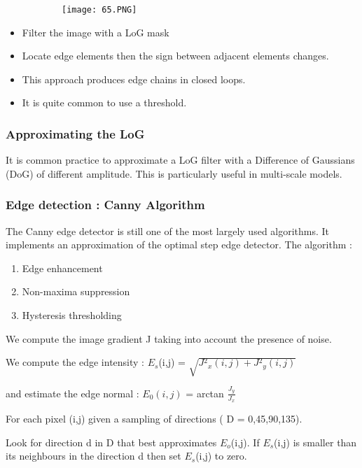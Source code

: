 \documentclass{article}
\begin{document}
\begin{figure}[ht!]
  \centering
  \begin{subfigure}[b]{0.45\linewidth}
    \texttt{[image: 65.PNG]}
  \end{subfigure}
\end{figure}

\begin{itemize}
    \item Filter the image with a LoG mask
    \item Locate edge elements then the sign between adjacent elements changes.
    \item This approach produces edge chains in closed loops.
    \item It is quite common to use a threshold.
\end{itemize}

\subsubsection{Approximating the LoG}
It is common practice to approximate a LoG filter with a Difference of Gaussians (DoG) of different amplitude.
This is particularly useful in multi-scale models.


\subsubsection{Edge detection : Canny Algorithm}

The Canny edge detector is still one of the most largely used algorithms. It implements an approximation of the optimal step edge detector.
The algorithm :
\begin{enumerate}
    \item Edge enhancement 
    \item Non-maxima suppression
    \item Hysteresis thresholding
\end{enumerate}


We compute the image gradient J taking into account the presence of noise.

We compute the edge intensity :  $E_s$(i,j) = $\sqrt{J{^2}_x(i,j) + J{^2}_y(i,j)}$

and estimate the edge normal : $E_0 (i,j)$ = arctan $\frac{J_y}{J_x}$

For each pixel (i,j) given a sampling of directions ( D = {0,45,90,135}).

Look for direction d in D that best approximates $E_o$(i,j).
If $E_s$(i,j) is smaller than its neighbours in the direction d then set $E_s$(i,j) to zero.
\end{document}
